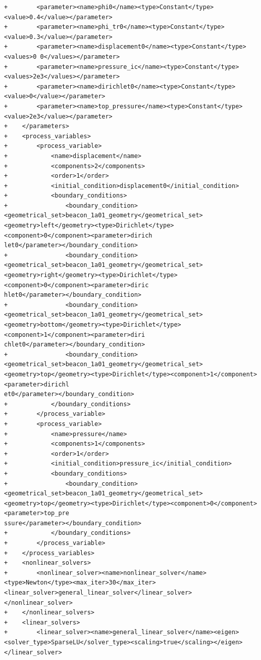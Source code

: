 \documentclass[10pt]{article}
\begin{document}
\begin{lstlisting}
+        <parameter><name>phi0</name><type>Constant</type><value>0.4</value></parameter>
+        <parameter><name>phi_tr0</name><type>Constant</type><value>0.3</value></parameter>
+        <parameter><name>displacement0</name><type>Constant</type><values>0 0</values></parameter>
+        <parameter><name>pressure_ic</name><type>Constant</type><values>2e3</values></parameter>
+        <parameter><name>dirichlet0</name><type>Constant</type><value>0</value></parameter>
+        <parameter><name>top_pressure</name><type>Constant</type><value>2e3</value></parameter>
+    </parameters>
+    <process_variables>
+        <process_variable>
+            <name>displacement</name>
+            <components>2</components>
+            <order>1</order>
+            <initial_condition>displacement0</initial_condition>
+            <boundary_conditions>
+                <boundary_condition><geometrical_set>beacon_1a01_geometry</geometrical_set><geometry>left</geometry><type>Dirichlet</type><component>0</component><parameter>dirich
let0</parameter></boundary_condition>
+                <boundary_condition><geometrical_set>beacon_1a01_geometry</geometrical_set><geometry>right</geometry><type>Dirichlet</type><component>0</component><parameter>diric
hlet0</parameter></boundary_condition>
+                <boundary_condition><geometrical_set>beacon_1a01_geometry</geometrical_set><geometry>bottom</geometry><type>Dirichlet</type><component>1</component><parameter>diri
chlet0</parameter></boundary_condition>
+                <boundary_condition><geometrical_set>beacon_1a01_geometry</geometrical_set><geometry>top</geometry><type>Dirichlet</type><component>1</component><parameter>dirichl
et0</parameter></boundary_condition>
+            </boundary_conditions>
+        </process_variable>
+        <process_variable>
+            <name>pressure</name>
+            <components>1</components>
+            <order>1</order>
+            <initial_condition>pressure_ic</initial_condition>
+            <boundary_conditions>
+                <boundary_condition><geometrical_set>beacon_1a01_geometry</geometrical_set><geometry>top</geometry><type>Dirichlet</type><component>0</component><parameter>top_pre
ssure</parameter></boundary_condition>
+            </boundary_conditions>
+        </process_variable>
+    </process_variables>
+    <nonlinear_solvers>
+        <nonlinear_solver><name>nonlinear_solver</name><type>Newton</type><max_iter>30</max_iter><linear_solver>general_linear_solver</linear_solver></nonlinear_solver>
+    </nonlinear_solvers>
+    <linear_solvers>
+        <linear_solver><name>general_linear_solver</name><eigen><solver_type>SparseLU</solver_type><scaling>true</scaling></eigen></linear_solver>

\end{lstlisting}
\end{document}
